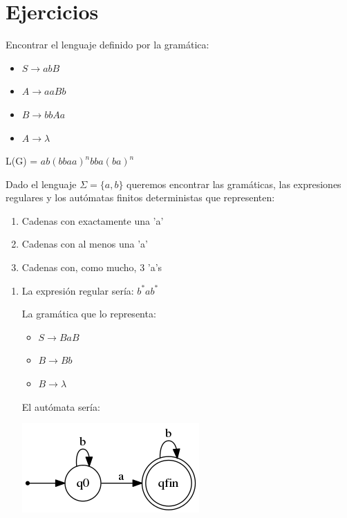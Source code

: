 \section{Ejercicios}

\begin{problem}
Encontrar el lenguaje definido por la gramática:
\begin{itemize}
\item $S \rightarrow abB$
\item $A \rightarrow aaBb$
\item $B \rightarrow bbAa$
\item $A \rightarrow \lambda$
\end{itemize}
\solution
 L(G) = $ab(bbaa)^nbba(ba)^n$
\end{problem}

\begin{problem}
Dado el lenguaje $\Sigma = \lbrace a,b \rbrace$ queremos encontrar las gramáticas, las expresiones regulares y los autómatas finitos deterministas que representen:
\begin{enumerate}
\item Cadenas con exactamente una 'a'
\item Cadenas con al menos una 'a'
\item Cadenas con, como mucho, 3 'a's
\end{enumerate}
\solution

\begin{enumerate}
\item 
La expresión regular sería: $b^*a b^*$

La gramática que lo representa:

\begin{itemize}
\item $S \rightarrow BaB$
\item $B \rightarrow Bb$
\item $B \rightarrow \lambda$
\end{itemize}

El autómata sería:
\begin{center}
\includegraphics[scale=0.75]{tex/automata1.png}
\end{center}


\end{enumerate}
\end{problem}
